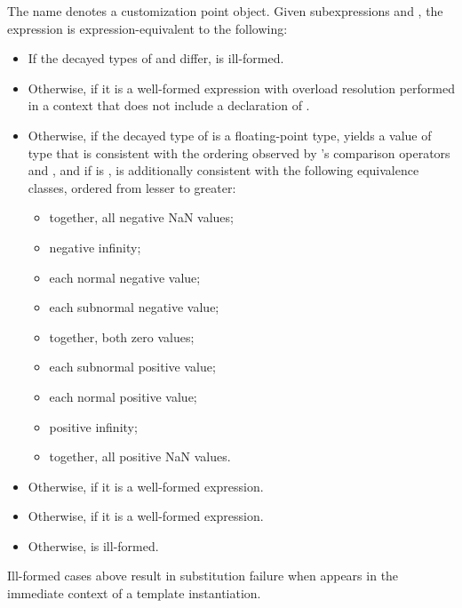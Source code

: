 %
\pnum
The name  denotes
a customization point object.
Given subexpressions  and ,
the expression 
is expression-equivalent to the following:
\begin{itemize}
\item
  If the decayed types of  and  differ,
   is ill-formed.
\item
  Otherwise, 
  if it is a well-formed expression
  with overload resolution performed in a context
  that does not include a declaration of .
\item
  Otherwise, if the decayed type  of 
  is a floating-point type,
  yields a value of type 
  that is consistent with the ordering
  observed by 's comparison operators and , and
  if  is ,
  is additionally consistent with the following equivalence classes,
  ordered from lesser to greater:
  \begin{itemize}
  \item together, all negative NaN values;
  \item negative infinity;
  \item each normal negative value;
  \item each subnormal negative value;
  \item together, both zero values;
  \item each subnormal positive value;
  \item each normal positive value;
  \item positive infinity;
  \item together, all positive NaN values.
  \end{itemize}
\item
  Otherwise, 
  if it is a well-formed expression.
\item
  Otherwise, 
  if it is a well-formed expression.
\item
  Otherwise,  is ill-formed.
\end{itemize}

\begin{note}
Ill-formed cases above result in substitution failure
when  appears in the immediate context
of a template instantiation.
\end{note}

